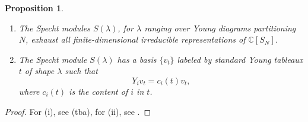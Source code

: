 \documentclass[11pt]{report}
\newtheorem{prop}[theorem]{Proposition}
\theoremstyle{definition}
\theoremstyle{remark}
\theoremstyle{remark}
\newcommand{\C}{\mathbb{C}}
\begin{document}
\begin{prop}
\begin{enumerate}[label=(\roman*)]
\item The Specht modules $S(\lambda)$, for $\lambda$ ranging over Young diagrams partitioning $N$, exhaust all finite-dimensional irreducible representations of $\C[S_N]$.
\item The Specht module $S(\lambda)$ has a basis $\{ v_t \}$ labeled by standard Young tableaux $t$ of shape $\lambda$ such that
\begin{equation*}
Y_i v_t = c_i(t) v_t,
\end{equation*}
where $c_i(t)$ is the content of $i$ in $t$.
\end{enumerate}
\end{prop}

\begin{proof}
For (i), see (tba), for (ii), see \cite{article:murphy:1981}.
\end{proof}
\end{document}
